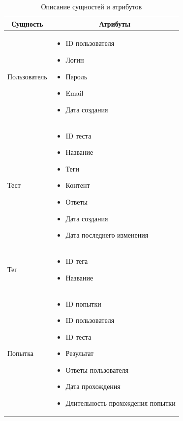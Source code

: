 \begin{table}[h!]
    \begin{center}
        \begin{tabular}{|l|p{6.5cm}|}
            \hline
            \multicolumn{1}{|c|}{\textbf{Сущность}} & \multicolumn{1}{c|}{\textbf{Атрибуты}} \\ \hline
            Пользователь & \begin{itemize}
                \item ID пользователя
                \item Логин
                \item Пароль
                \item Email
                \item Дата создания
            \end{itemize} \\ \hline
            Тест & \begin{itemize}
                \item ID теста
                \item Название
                \item Теги
                \item Контент
                \item Ответы
                \item Дата создания
                \item Дата последнего изменения
            \end{itemize} \\ \hline
            Тег & \begin{itemize}
                \item ID тега
                \item Название
            \end{itemize}
            \\ \hline
            Попытка & \begin{itemize}
                \item ID попытки
                \item ID пользователя
                \item ID теста
                \item Результат
                \item Ответы пользователя
                \item Дата прохождения
                \item Длительность прохождения попытки
            \end{itemize}
            \\ \hline
        \end{tabular}
    \end{center}
    \caption{Описание сущностей и атрибутов}
\end{table}

